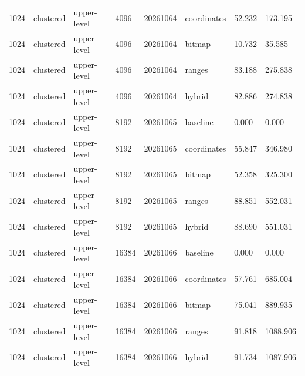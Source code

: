 \begin{tabular}{llllllll}
1024 & clustered & upper-level & 4096 & 20261064 & coordinates & 52.232 & 173.195 \\
1024 & clustered & upper-level & 4096 & 20261064 & bitmap & 10.732 & 35.585 \\
1024 & clustered & upper-level & 4096 & 20261064 & ranges & 83.188 & 275.838 \\
1024 & clustered & upper-level & 4096 & 20261064 & hybrid & 82.886 & 274.838 \\
1024 & clustered & upper-level & 8192 & 20261065 & baseline & 0.000 & 0.000 \\
1024 & clustered & upper-level & 8192 & 20261065 & coordinates & 55.847 & 346.980 \\
1024 & clustered & upper-level & 8192 & 20261065 & bitmap & 52.358 & 325.300 \\
1024 & clustered & upper-level & 8192 & 20261065 & ranges & 88.851 & 552.031 \\
1024 & clustered & upper-level & 8192 & 20261065 & hybrid & 88.690 & 551.031 \\
1024 & clustered & upper-level & 16384 & 20261066 & baseline & 0.000 & 0.000 \\
1024 & clustered & upper-level & 16384 & 20261066 & coordinates & 57.761 & 685.004 \\
1024 & clustered & upper-level & 16384 & 20261066 & bitmap & 75.041 & 889.935 \\
1024 & clustered & upper-level & 16384 & 20261066 & ranges & 91.818 & 1088.906 \\
1024 & clustered & upper-level & 16384 & 20261066 & hybrid & 91.734 & 1087.906 \\
\end{tabular}
